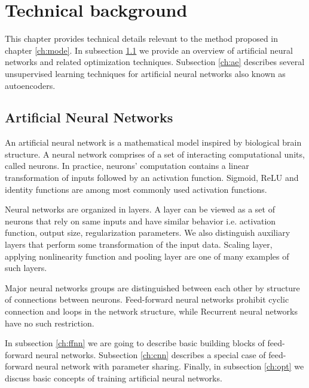 
\chapter{Technical background}
\label{ch:tede}

This chapter provides technical details relevant to the method proposed in chapter \ref{ch:mode}.
In subsection \ref{ch:nn} we provide an overview of artificial neural networks and related optimization techniques.
Subsection \ref{ch:ae} describes several unsupervised learning techniques for artificial neural networks also known as autoencoders.

\section{Artificial Neural Networks}
\label{ch:nn}
An artificial neural network is a mathematical model inspired by biological brain structure.
A neural network comprises of a set of interacting computational units, called neurons.
In practice, neurons' computation contains a linear transformation of inputs followed by an activation function.
Sigmoid, ReLU and identity functions are among most commonly used activation functions.

Neural networks are organized in layers.
A layer can be viewed as a set of neurons that rely on same inputs and have similar behavior i.e. activation function, output size, regularization parameters.
We also distinguish auxiliary layers that perform some transformation of the input data.
Scaling layer, applying nonlinearity function and pooling layer are one of many examples of such layers.

Major neural networks groups are distinguished between each other by structure of connections between neurons.
Feed-forward neural networks prohibit cyclic connection and loops in the network structure, while Recurrent neural networks have no such restriction.

In subsection \ref{ch:ffnn} we are going to describe basic building blocks of feed-forward neural networks.
Subsection \ref{ch:cnn} describes a special case of feed-forward neural network with parameter sharing.
Finally, in subsection \ref{ch:opt} we discuss basic concepts of training artificial neural networks.



